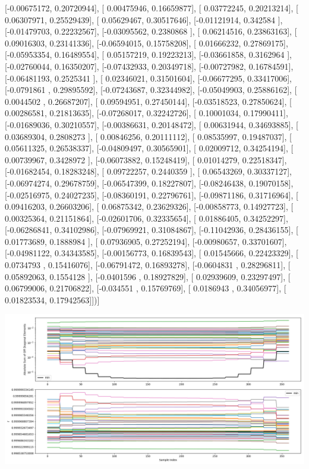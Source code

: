 \documentclass{article}
\begin{document}
       [-0.00675172,  0.20720944],
       [ 0.00475946,  0.16659877],
       [ 0.03772245,  0.20213214],
       [ 0.06307971,  0.25529439],
       [ 0.05629467,  0.30517646],
       [-0.01121914,  0.342584  ],
       [-0.01479703,  0.22232567],
       [-0.03095562,  0.2380868 ],
       [ 0.06214516,  0.23863163],
       [ 0.09016303,  0.23141336],
       [-0.06594015,  0.15758208],
       [ 0.01666232,  0.27869175],
       [-0.05953354,  0.16489554],
       [ 0.05157219,  0.19223213],
       [-0.03661858,  0.3162964 ],
       [-0.02760044,  0.16350207],
       [-0.07432933,  0.20349718],
       [-0.00727982,  0.16784591],
       [-0.06481193,  0.2525341 ],
       [ 0.02346021,  0.31501604],
       [-0.06677295,  0.33417006],
       [-0.0791861 ,  0.29895592],
       [-0.07243687,  0.32344982],
       [-0.05049903,  0.25886162],
       [ 0.0044502 ,  0.26687207],
       [ 0.09594951,  0.27450144],
       [-0.03518523,  0.27850624],
       [ 0.00286581,  0.21813635],
       [-0.07268017,  0.32242726],
       [ 0.10001034,  0.17990411],
       [-0.01689036,  0.30210557],
       [-0.00386631,  0.20148472],
       [ 0.00631944,  0.34693885],
       [ 0.03689304,  0.2808273 ],
       [ 0.00846256,  0.20111112],
       [ 0.08535997,  0.19487037],
       [ 0.05611325,  0.26538337],
       [-0.04809497,  0.30565901],
       [ 0.02009712,  0.34254194],
       [ 0.00739967,  0.3428972 ],
       [-0.06073882,  0.15248419],
       [ 0.01014279,  0.22518347],
       [-0.01682454,  0.18283248],
       [ 0.09722257,  0.2440359 ],
       [ 0.06543269,  0.30337127],
       [-0.06974274,  0.29678759],
       [-0.06547399,  0.18227807],
       [-0.08246438,  0.19070158],
       [-0.02516975,  0.24027235],
       [-0.08360191,  0.22796761],
       [-0.09871186,  0.31716964],
       [ 0.09416203,  0.26603206],
       [ 0.06875342,  0.23629326],
       [-0.00858773,  0.14927723],
       [ 0.00325364,  0.21151864],
       [-0.02601706,  0.32335654],
       [ 0.01886405,  0.34252297],
       [-0.06286841,  0.34102986],
       [-0.07969921,  0.31084867],
       [-0.11042936,  0.28436155],
       [ 0.01773689,  0.1888984 ],
       [ 0.07936905,  0.27252194],
       [-0.00980657,  0.33701607],
       [-0.04981122,  0.34343585],
       [-0.00156773,  0.16839543],
       [ 0.01545666,  0.22423329],
       [ 0.0734793 ,  0.15416076],
       [-0.06791472,  0.16893278],
       [-0.0604831 ,  0.28296811],
       [ 0.05892063,  0.1554128 ],
       [-0.0401596 ,  0.18927829],
       [ 0.02939609,  0.23297497],
       [ 0.06799006,  0.21706822],
       [-0.034551  ,  0.15769769],
       [ 0.0186943 ,  0.34056977],
       [ 0.01823534,  0.17942563]])]
\begin{center}
\includegraphics[scale=.9]{report_pickled_controls237/control_dpn_all.png}

\end{center}
\end{document}
